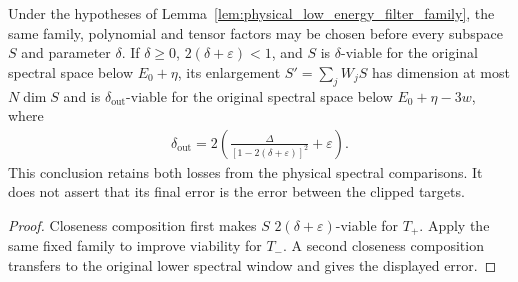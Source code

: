 \begin{lemma}
    \label{cor:original_low_energy_filter_family}
    \leanok
    Under the hypotheses of Lemma~\ref{lem:physical_low_energy_filter_family},
    the same family, polynomial and tensor factors may be chosen before
    every subspace $S$ and parameter $\delta$. If $\delta\ge0$,
    $2(\delta+\varepsilon)<1$, and $S$ is $\delta$-viable for the original
    spectral space below $E_0+\eta$, its enlargement $S'=\sum_jW_jS$ has
    dimension at most $N\dim S$ and is $\delta_{\mathrm{out}}$-viable for
    the original spectral space below $E_0+\eta-3w$, where
    \begin{align*}
        \delta_{\mathrm{out}}=
        2\left(\frac{\Delta}{[1-2(\delta+\varepsilon)]^2}
        +\varepsilon\right).
    \end{align*}
    This conclusion retains both losses from the physical spectral
    comparisons. It does not assert that its final error is the error
    between the clipped targets.
\end{lemma}
\begin{proof}\leanok
    Closeness composition first makes $S$ $2(\delta+\varepsilon)$-viable
    for $T_+$. Apply the same fixed family to improve viability for $T_-$.
    A second closeness composition transfers to the original lower
    spectral window and gives the displayed error.
\end{proof}
